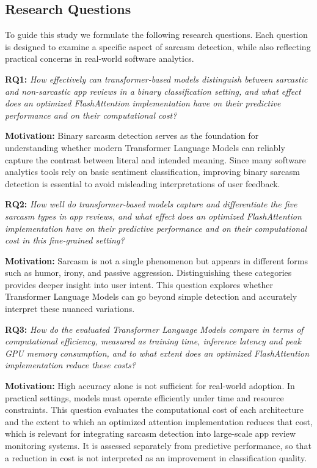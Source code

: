\documentclass[a4paper,fleqn]{cas-sc}
\begin{document}
\subsection{Research Questions}
To guide this study we formulate the following research questions. Each question is designed to examine a specific aspect of sarcasm detection, while also reflecting practical concerns in real-world software analytics.

\begin{rqbox}
\textbf{RQ1:} \textit{How effectively can transformer-based models distinguish between sarcastic and non-sarcastic app reviews in a binary classification setting, and what effect does an optimized FlashAttention implementation have on their predictive performance and on their computational cost?}
\end{rqbox}
\noindent\textbf{Motivation:} Binary sarcasm detection serves as the foundation for understanding whether modern Transformer Language Models can reliably capture the contrast between literal and intended meaning. Since many software analytics tools rely on basic sentiment classification, improving binary sarcasm detection is essential to avoid misleading interpretations of user feedback.

\begin{rqbox}
\textbf{RQ2:} \textit{How well do transformer-based models capture and differentiate the five sarcasm types in app reviews, and what effect does an optimized FlashAttention implementation have on their predictive performance and on their computational cost in this fine-grained setting?}
\end{rqbox}
\noindent\textbf{Motivation:} Sarcasm is not a single phenomenon but appears in different forms such as humor, irony, and passive aggression. Distinguishing these categories provides deeper insight into user intent. This question explores whether Transformer Language Models can go beyond simple detection and accurately interpret these nuanced variations.

\begin{rqbox}
\textbf{RQ3:} \textit{How do the evaluated Transformer Language Models compare in terms of computational efficiency, measured as training time, inference latency and peak GPU memory consumption, and to what extent does an optimized FlashAttention implementation reduce these costs?}
\end{rqbox}
\noindent\textbf{Motivation:} High accuracy alone is not sufficient for real-world adoption. In practical settings, models must operate efficiently under time and resource constraints. This question evaluates the computational cost of each architecture and the extent to which an optimized attention implementation reduces that cost, which is relevant for integrating sarcasm detection into large-scale app review monitoring systems. It is assessed separately from predictive performance, so that a reduction in cost is not interpreted as an improvement in classification quality.
\end{document}

